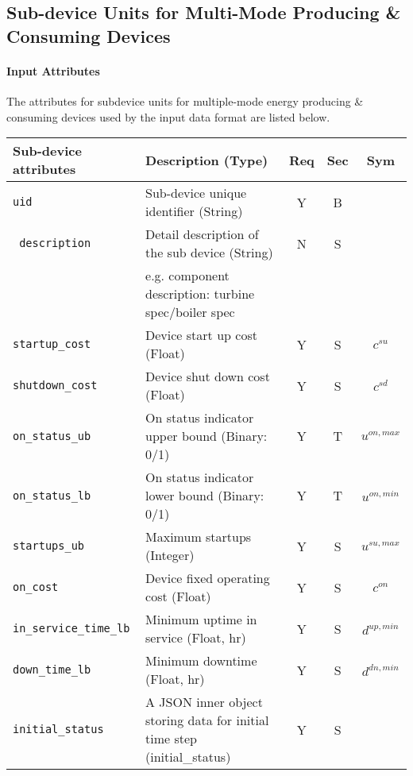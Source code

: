 \documentclass{article}
\begin{document}
\subsection{Sub-device Units for Multi-Mode Producing \& Consuming Devices}
\label{nom:gen_sub}
\paragraph{Input Attributes}
The attributes for 
subdevice units for multiple-mode energy producing \& consuming devices used by the input data format are listed below.

\begin{center}
\small
{\color{red}
\begin{tabular}{ l | l | c | c | c |}
Sub-device attributes & Description (Type) & Req & Sec & Sym\\
\hline
  {\tt uid} & Sub-device unique identifier (String) & Y & B &  \\
  {\tt\color{red} description} & Detail description of the sub device  (String) & N & S & \\
      &e.g. component description: turbine spec/boiler spec  &  &  & \\
  {\tt startup\_cost} & Device start up cost (Float) & Y & S & $c^{su}$\\
  {\tt shutdown\_cost} & Device shut down cost (Float) & Y & S & $c^{sd}$\\  
  {\tt on\_status\_ub} & On status indicator upper bound (Binary: 0/1) & Y & T & $u^{on,max}$\\
  {\tt on\_status\_lb} & On status indicator lower bound (Binary: 0/1) & Y & T & $u^{on,min}$\\

  {\tt startups\_ub} & Maximum startups (Integer) & Y & S & $u^{su,max}$\\  
  {\tt on\_cost} & Device fixed operating cost (Float) & Y & S & $c^{on}$\\
  {\tt in\_service\_time\_lb} & Minimum uptime in service (Float, hr) & Y & S & $d^{up,min}$\\
  {\tt down\_time\_lb} & Minimum downtime (Float, hr) & Y & S & $d^{dn,min}$\\
 
  {\tt initial\_status} & A JSON inner object storing data for initial time step (initial\_status) & Y & S &  \\
  \hline
\end{tabular}
}
\end{center}
\end{document}
